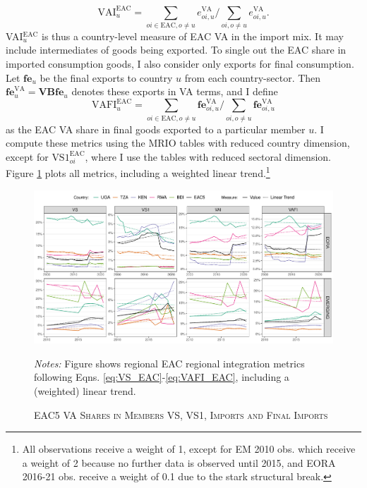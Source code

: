 \documentclass[a4paper]{article}
\begin{document}
%
\begin{equation}
\text{VAI}_u^\text{EAC} = \sum_{oi \in \text{EAC}, o \neq u}  e_{oi, u}^\text{VA}  \bigg/ \sum_{oi, o \neq u}  e_{oi, u}^\text{VA}.  
\end{equation}
%
VAI$_u^\text{EAC}$ is thus a country-level measure of EAC VA in the import mix. It may include intermediates of goods being exported. To single out the EAC share in imported consumption goods, I also consider only exports for final consumption. Let $\textbf{fe}_u$ be the final exports to country $u$ from each country-sector. Then $\textbf{fe}_u^\text{VA} = \textbf{VBfe}_u$ denotes these exports in VA terms, and I define
%
\begin{equation} \label{eq:VAFI_EAC}
\text{VAFI}_{u}^\text{EAC} = \sum_{oi \in \text{EAC}, o \neq u}  \textbf{fe}_{oi, u}^\text{VA}  \bigg/ \sum_{oi, o \neq u}  \textbf{fe}_{oi, u}^\text{VA}
\end{equation}
%
\noindent as the EAC VA share in final goods exported to a particular member $u$. I compute these metrics using the MRIO tables with reduced country dimension, except for $\text{VS1}_{oi}^\text{EAC}$, where I use the tables with reduced sectoral dimension. Figure \ref{fig:VAEACshares} plots all metrics, including a weighted linear trend.\footnote{All observations receive a weight of 1, except for EM 2010 obs. which receive a weight of 2 because no further data is observed until 2015, and EORA 2016-21 obs. receive a weight of 0.1 due to the stark structural break. \vspace{-4mm}}

\begin{figure}[h!] 
\centering
\caption{\label{fig:VAEACshares}\textsc{EAC5 VA Shares in Members VS, VS1, Imports and Final Imports}}
\includegraphics[width=1\textwidth, trim= {0 0 0 0}, clip]{"VA_EAC5_shares_ts.pdf"} \\ 
\raggedright
\scriptsize
\emph{Notes:} Figure shows regional EAC regional integration metrics following Eqns. \ref{eq:VS_EAC}-\ref{eq:VAFI_EAC}, including a (weighted) linear trend. 
\end{figure}
\FloatBarrier
\end{document}
